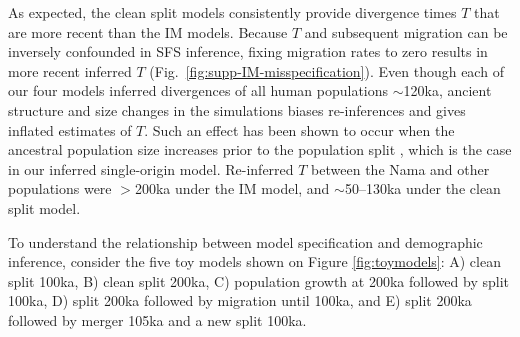 \documentclass[]{article}
\begin{document}
As expected, the clean split models consistently provide divergence times $T$
that are more recent than the IM models. Because $T$ and subsequent migration
can be inversely confounded in SFS inference, fixing migration rates to zero
results in more recent inferred $T$ (Fig.~\ref{fig:supp-IM-misspecification}).
Even though each of our four models inferred divergences of all human
populations $\sim$120ka, ancient structure and size changes in the simulations
biases re-inferences and gives inflated estimates of $T$. Such an effect has
been shown to occur when the ancestral population size increases prior to the
population split \citep{Momigliano2021-th}, which is the case in our inferred
single-origin model. Re-inferred $T$ between the Nama and other populations
were $>$200ka under the IM model, and $\sim$50--130ka under the clean split
model.

To understand the relationship between model specification and demographic inference, 
consider the five toy models shown on Figure \ref{fig:toymodels}: A) clean split 100ka, 
B) clean split 200ka, C) population growth at 200ka followed by split 100ka, 
D) split 200ka followed by migration until 100ka, and E) split 200ka followed by 
merger 105ka and a new split 100ka. 
\end{document}
